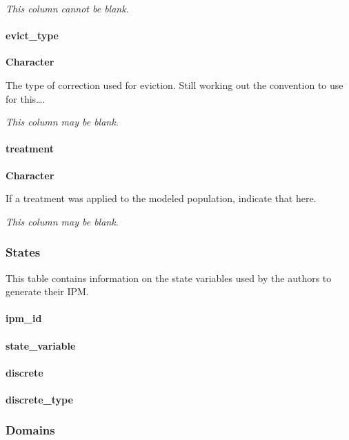 \documentclass[]{article}
\let\oldparagraph\paragraph
\renewcommand{\paragraph}[1]{\oldparagraph{#1}\mbox{}}
\begin{document}
\emph{This column cannot be blank.}

\paragraph{evict\_type}\label{evict_type}

\textbf{Character}

The type of correction used for eviction. Still working out the
convention to use for this\ldots{}.

\emph{This column may be blank.}

\paragraph{treatment}\label{treatment}

\textbf{Character}

If a treatment was applied to the modeled population, indicate that
here.

\emph{This column may be blank}.

\subsubsection{States}\label{states}

This table contains information on the state variables used by the
authors to generate their IPM.

\paragraph{ipm\_id}\label{ipm_id-1}

\paragraph{state\_variable}\label{state_variable}

\paragraph{discrete}\label{discrete}

\paragraph{discrete\_type}\label{discrete_type}

\subsubsection{Domains}\label{domains}
\end{document}
